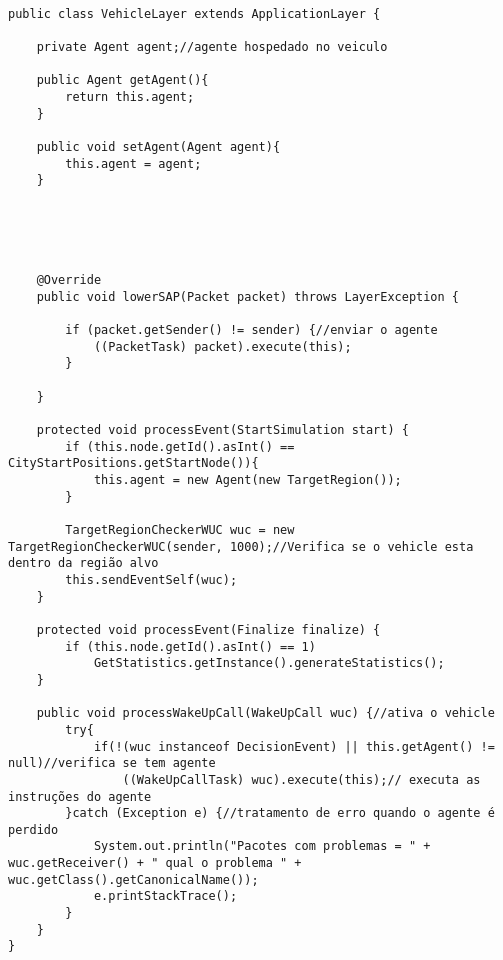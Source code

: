 \begin{lstlisting}

public class VehicleLayer extends ApplicationLayer {

	private Agent agent;//agente hospedado no veiculo
	
	public Agent getAgent(){
		return this.agent;
	}
	
	public void setAgent(Agent agent){
		this.agent = agent;
	}





	@Override
	public void lowerSAP(Packet packet) throws LayerException {

		if (packet.getSender() != sender) {//enviar o agente
			((PacketTask) packet).execute(this);
		}
		
	}

	protected void processEvent(StartSimulation start) {
		if (this.node.getId().asInt() == CityStartPositions.getStartNode()){
			this.agent = new Agent(new TargetRegion());
		}
	
		TargetRegionCheckerWUC wuc = new TargetRegionCheckerWUC(sender, 1000);//Verifica se o vehicle esta dentro da região alvo
		this.sendEventSelf(wuc);
	}

	protected void processEvent(Finalize finalize) {
		if (this.node.getId().asInt() == 1)
			GetStatistics.getInstance().generateStatistics();
	}

	public void processWakeUpCall(WakeUpCall wuc) {//ativa o vehicle
		try{
			if(!(wuc instanceof DecisionEvent) || this.getAgent() != null)//verifica se tem agente
				((WakeUpCallTask) wuc).execute(this);// executa as instruções do agente
		}catch (Exception e) {//tratamento de erro quando o agente é perdido
			System.out.println("Pacotes com problemas = " + wuc.getReceiver() + " qual o problema " + wuc.getClass().getCanonicalName());
			e.printStackTrace();
		}
	}
}
\end{lstlisting}
